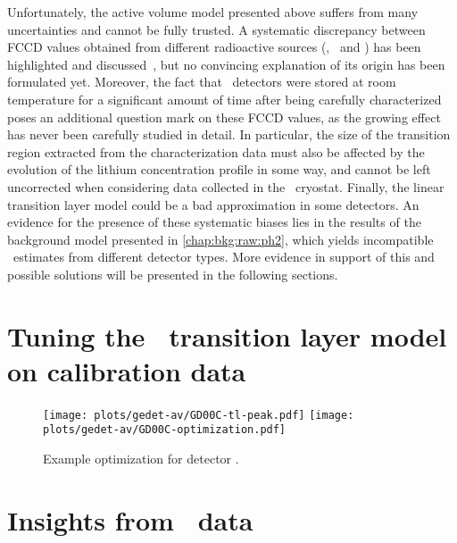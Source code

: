 Unfortunately, the active volume model presented above suffers from many uncertainties and
cannot be fully trusted. A systematic discrepancy between FCCD values obtained from
different radioactive sources (\Am, \Ba\ and \Co) has been highlighted and
discussed~\cite{Lehnert2016}, but no convincing explanation of its origin has been
formulated yet. Moreover, the fact that \bege\ detectors were stored at room temperature
for a significant amount of time after being carefully characterized poses an additional
question mark on these FCCD values, as the growing effect has never been carefully studied
in detail. In particular, the size of the transition region extracted from the
characterization data must also be affected by the evolution of the lithium concentration
profile in some way, and cannot be left uncorrected when considering data collected in the
\gerda\ cryostat. Finally, the linear transition layer model could be a bad approximation
in some detectors. An evidence for the presence of these systematic biases lies in the
results of the background model presented in \cref{chap:bkg:raw:ph2}, which yields
incompatible \thalftwo\ estimates from different detector types. More evidence in support
of this and possible solutions will be presented in the following sections.

\section{Tuning the \bege\ transition layer model on calibration data}%
\label{sec:gedetav:calib-optim}


\begin{table}
  \centering
  \caption{%
    \bege\ dead layer fractions obtained from calibration data. 
  }\label{tab:gedetav:calib-optim}
  
\end{table}

\begin{figure}
  \centering
  \texttt{[image: plots/gedet-av/GD00C-tl-peak.pdf]}%
  \texttt{[image: plots/gedet-av/GD00C-optimization.pdf]}
  \caption{%
    Example optimization for detector . 
  }\label{fig:gedetav:calib-optim-example}
\end{figure}

\section{Insights from \Arl\ data}%
\label{sec:gedetav:ar39}

